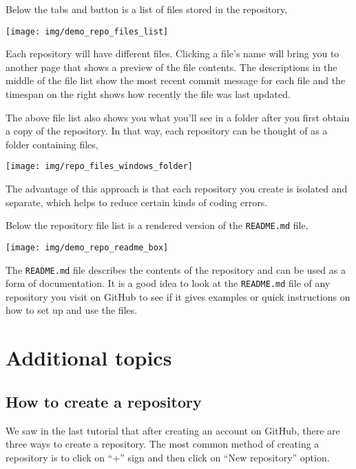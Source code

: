 \documentclass[
]{book}
\begin{document}
Below the tabs and button is a list of files stored in the repository,

\begin{center}\texttt{[image: img/demo\_repo\_files\_list]} \end{center}

Each repository will have different files.
Clicking a file's name will bring you to another page that shows a preview of the file contents.
The descriptions in the middle of the file list show the most recent commit message for each file and the timespan on the right shows how recently the file was last updated.

The above file list also shows you what you'll see in a folder after you first obtain a copy of the repository.
In that way, each repository can be thought of as a folder containing files,

\begin{center}\texttt{[image: img/repo\_files\_windows\_folder]} \end{center}

The advantage of this approach is that each repository you create is isolated and separate, which helps to reduce certain kinds of coding errors.

Below the repository file list is a rendered version of the \texttt{README.md} file,

\begin{center}\texttt{[image: img/demo\_repo\_readme\_box]} \end{center}

The \texttt{README.md} file describes the contents of the repository and can be used as a form of documentation.
It is a good idea to look at the \texttt{README.md} file of any repository you visit on GitHub to see if it gives examples or quick instructions on how to set up and use the files.

\hypertarget{additional-topics}{%
\section{Additional topics}\label{additional-topics}}

\hypertarget{how-to-create-a-repository}{%
\subsection{How to create a repository}\label{how-to-create-a-repository}}

We saw in the last tutorial that after creating an account on GitHub, there are three ways to create a repository. The most common method of creating a repository is to click on ``+'' sign and then click on ``New repository'' option.
\end{document}
